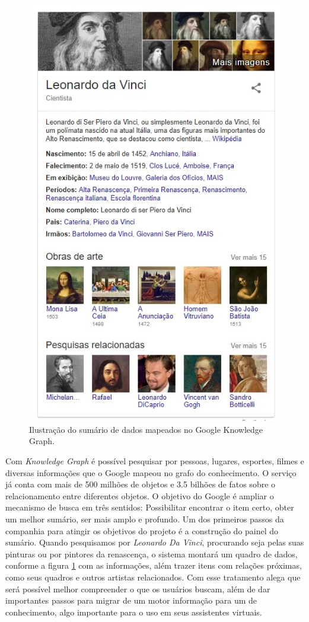 \begin{figure}
	\centering
	\includegraphics[scale=0.55]{imagens/knowledge_graph.jpg}
	\caption{Ilustração do sumário de dados mapeados no Google Knowledge Graph.}
	\label{fig:knowledge-graph}
\end{figure}

Com \textit{Knowledge Graph} é possível pesquisar por pessoas, lugares, esportes, filmes e diversas informações que o Google mapeou no grafo do conhecimento. O serviço já conta com mais de 500 milhões de objetos e 3.5 bilhões de fatos sobre o relacionamento entre diferentes objetos. O objetivo do Google é ampliar o mecanismo de busca em três sentidos: Possibilitar encontrar o item certo, obter um melhor sumário, ser mais amplo e profundo. Um dos primeiros passos da companhia para atingir os objetivos do projeto é a construção do painel do sumário. Quando pesquisamos por \textit{Leonardo Da Vinci}, procurando seja pelas suas pinturas ou por pintores da renascença, o sistema montará um quadro de dados, conforme a figura \ref{fig:knowledge-graph} com as informações, além trazer itens com relações próximas, como seus quadros e outros artistas relacionados. Com esse tratamento \cite{GoogleKnowledge} alega que será possível melhor compreender o que os usuários buscam, além de dar importantes passos para migrar de um motor informação para um de conhecimento, algo importante para o uso em seus assistentes virtuais.

